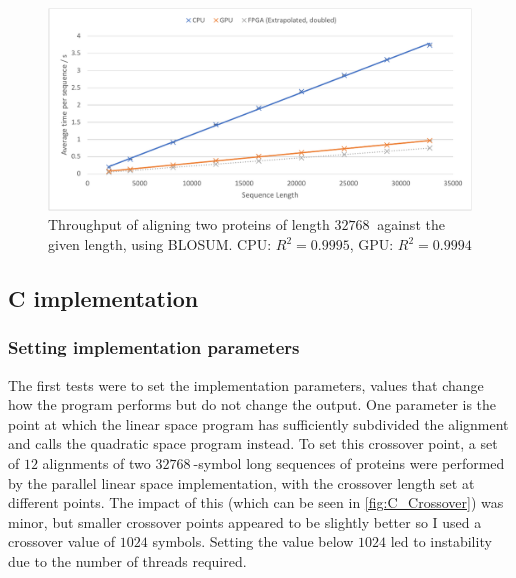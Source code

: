 \begin{figure}[H]
    \centering
    \includegraphics[width=\textwidth]{figs/eval/all3_big.pdf}
    \caption{Throughput of aligning two proteins of length $\SI{32768}{}$ against the given length, using BLOSUM. CPU: $R^2=0.9995$, GPU: ${R^2=0.9994}$}
    \label{fig:All3_Big}
\end{figure}

\subsection{C implementation}
\label{sec:C_eval}

\subsubsection{Setting implementation parameters}
\label{sec:C_params_eval}

The first tests were to set the implementation parameters, values that change how the program performs but do not change the output.
One parameter is the point at which the linear space program has sufficiently subdivided the alignment and calls the quadratic space program instead.
To set this crossover point, a set of $12$ alignments of two $\SI{32768}{}$-symbol long sequences of proteins were performed by the parallel linear space implementation, with the crossover length set at different points.
The impact of this (which can be seen in \cref{fig:C_Crossover}) was minor, but smaller crossover points appeared to be slightly better so I used a crossover value of $1024$ symbols.
Setting the value below $1024$ led to instability due to the number of threads required.

